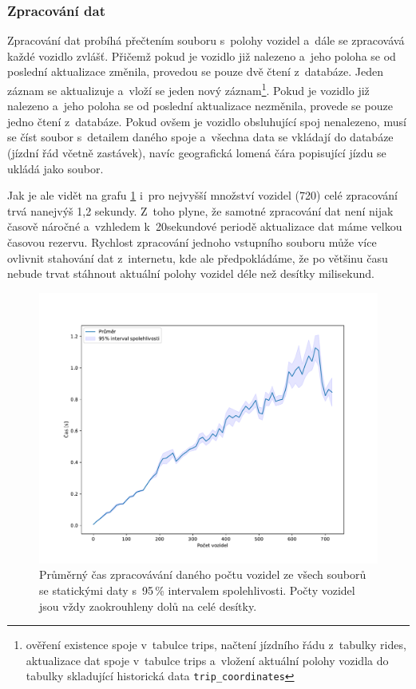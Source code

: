\subsubsection{Zpracování dat}

Zpracování dat probíhá přečtením souboru s~polohy vozidel a~dále se zpracovává každé vozidlo zvlášť. Přičemž pokud je vozidlo již nalezeno a~jeho poloha se od poslední aktualizace změnila, provedou se pouze dvě čtení z~databáze. Jeden záznam se aktualizuje a~vloží se jeden nový záznam\footnote{ověření existence spoje v~tabulce trips, načtení jízdního řádu z~tabulky rides, aktualizace dat spoje v~tabulce trips a~vložení aktuální polohy vozidla do tabulky skladující historická data \texttt{trip\_coordinates}}. Pokud je vozidlo již nalezeno a~jeho poloha se od poslední aktualizace nezměnila, provede se pouze jedno čtení z~databáze. Pokud ovšem je vozidlo obsluhující spoj nenalezeno, musí se číst soubor s~detailem daného spoje a~všechna data se vkládají do databáze (jízdní řád včetně zastávek), navíc geografická lomená čára popisující jízdu se ukládá jako soubor.


\bigbreak

Jak je ale vidět na grafu \ref{fig:file_process_time} i~pro nejvyšší množství vozidel (720) celé zpracování trvá nanejvýš 1,2 sekundy. Z~toho plyne, že samotné zpracování dat není nijak časově náročné a~vzhledem k~20sekundové periodě aktualizace dat máme velkou časovou rezervu. Rychlost zpracování jednoho vstupního souboru může více ovlivnit stahování dat z~internetu, kde ale předpokládáme, že po většinu času nebude trvat stáhnout aktuální polohy vozidel déle než desítky milisekund.

\begin{figure}
   \centering
 \includegraphics[width=\linewidth]{../img/file_process_time}
 \caption{Průměrný čas zpracovávání daného počtu vozidel ze všech souborů se statickými daty s~95\,\% intervalem spolehlivosti. Počty vozidel jsou vždy zaokrouhleny dolů na celé desítky.}
 \label{fig:file_process_time}
\end{figure}


